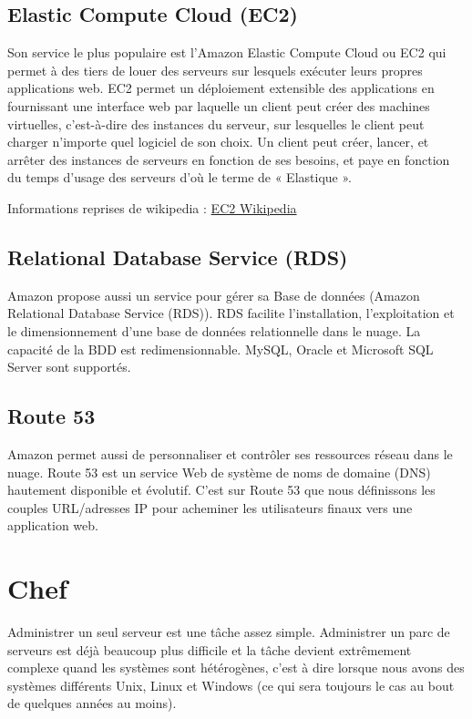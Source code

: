 \subsection{Elastic Compute Cloud (EC2)}

Son service le plus populaire est l'Amazon Elastic Compute Cloud ou EC2 qui
permet à des tiers de louer des serveurs sur lesquels exécuter leurs propres
applications web. EC2 permet un déploiement extensible des applications en
fournissant une interface web par laquelle un client peut créer des machines
virtuelles, c'est-à-dire des instances du serveur, sur lesquelles le client peut
charger n'importe quel logiciel de son choix. Un client peut créer, lancer, et
arrêter des instances de serveurs en fonction de ses besoins, et paye en
fonction du temps d'usage des serveurs d'où le terme de « Elastique ».

Informations reprises de wikipedia :
\href{http://fr.wikipedia.org/wiki/Amazon_Elastic_Compute_Cloud}{EC2 Wikipedia}\\

\subsection{Relational Database Service (RDS)}

Amazon propose aussi un service pour gérer sa Base de données (Amazon
Relational Database Service (RDS)). 
RDS facilite l'installation, l'exploitation et le dimensionnement d'une base de
données relationnelle dans le nuage. La capacité de la BDD est redimensionnable.
MySQL, Oracle et Microsoft SQL Server sont supportés.

\subsection{Route 53}

Amazon permet aussi de personnaliser et contrôler ses ressources réseau dans le
nuage.
Route 53 est un service Web de système de noms de domaine (DNS) hautement
disponible et évolutif. C'est sur Route 53 que nous définissons les couples
URL/adresses IP pour acheminer les utilisateurs finaux vers une application
web.

\section{Chef}

Administrer un seul serveur est une tâche assez simple. Administrer un parc de
serveurs est déjà beaucoup plus difficile et la tâche devient extrêmement
complexe quand les systèmes sont hétérogènes, c'est à dire lorsque nous avons
des systèmes différents Unix, Linux et Windows (ce qui sera toujours le cas au
bout de quelques années au moins).\\


